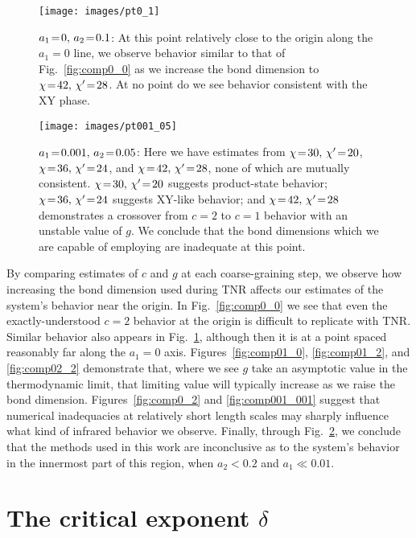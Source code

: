 \documentclass[aps,prb,letterpaper,superscriptaddress,twocolumn,showpacs,floatfix,10pt]{revtex4-1}
\begin{document}
\begin{figure}
\texttt{[image: images/pt0\_1]}
\caption{$a_1\nobreak\!=\nobreak\!0, \,a_2\nobreak\!=\nobreak\!0.1$: At this point relatively close to the origin along the
$a_1=0$ line, we observe behavior similar to that of Fig.~\ref{fig:comp0_0}
as we increase the bond dimension to $\chi\nobreak\!=\nobreak\!42, \,\chi'\nobreak\!=\nobreak\!28$. At no point do we see
behavior consistent with the XY phase.}
\label{fig:comp0_1}
\end{figure}
\begin{figure}
\texttt{[image: images/pt001\_05]}
\caption{$a_1\nobreak\!=\nobreak\!0.001, \,a_2\nobreak\!=\nobreak\!0.05$: Here we have estimates from $\chi\nobreak\!=\nobreak\!30, \,\chi'\nobreak\!=\nobreak\!20$,
$\chi\nobreak\!=\nobreak\!36, \,\chi'\nobreak\!=\nobreak\!24$, and $\chi\nobreak\!=\nobreak\!42, \,\chi'\nobreak\!=\nobreak\!28$, none of which are mutually consistent.
$\chi\nobreak\!=\nobreak\!30, \,\chi'\nobreak\!=\nobreak\!20$ suggests product-state behavior; $\chi\nobreak\!=\nobreak\!36, \,\chi'\nobreak\!=\nobreak\!24$ suggests
XY-like behavior; and $\chi\nobreak\!=\nobreak\!42, \,\chi'\nobreak\!=\nobreak\!28$ demonstrates a crossover from $c=2$ to
$c=1$ behavior with an unstable value of $g$. We conclude that the bond
dimensions which we are capable of employing are inadequate at this point.}
\label{fig:comp001_05}
\end{figure}
By comparing estimates of $c$ and $g$ at each coarse-graining step,
we observe how increasing the bond dimension used during TNR affects our
estimates of the system's behavior near the origin.
In Fig.~\ref{fig:comp0_0} we see that even
the exactly-understood $c=2$ behavior at the origin is difficult to replicate
with TNR. Similar behavior also appears in Fig.~\ref{fig:comp0_1}, although
then it is at a point spaced reasonably far along the $a_1=0$ axis.
Figures~\ref{fig:comp01_0}, \ref{fig:comp01_2}, and \ref{fig:comp02_2}
demonstrate that, where we see $g$ take an asymptotic value in the
thermodynamic limit,
that limiting value will typically increase as we raise the bond dimension.
Figures~\ref{fig:comp0_2} and \ref{fig:comp001_001} suggest that numerical
inadequacies at relatively short length scales may sharply influence what
kind of infrared behavior we observe. Finally, through
Fig.~\ref{fig:comp001_05}, we conclude that the methods used in this work are
inconclusive as to the system's behavior in the innermost part of this
region, when $a_2 < 0.2$ and $a_1 \ll 0.01$.

\section{The critical exponent $\delta$}
\label{app:delta}
\end{document}
